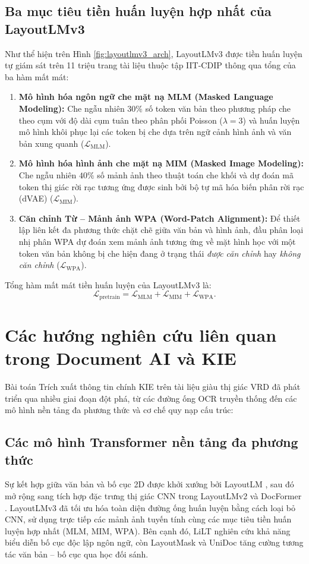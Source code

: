 \subsection{Ba mục tiêu tiền huấn luyện hợp nhất của LayoutLMv3}
Như thể hiện trên Hình \ref{fig:layoutlmv3_arch}, LayoutLMv3 được tiền huấn luyện tự giám sát trên 11 triệu trang tài liệu thuộc tập IIT-CDIP thông qua tổng của ba hàm mất mát:
\begin{enumerate}
    \item \textbf{Mô hình hóa ngôn ngữ che mặt nạ MLM (Masked Language Modeling):} Che ngẫu nhiên $30\%$ số token văn bản theo phương pháp che theo cụm với độ dài cụm tuân theo phân phối Poisson ($\lambda = 3$) và huấn luyện mô hình khôi phục lại các token bị che dựa trên ngữ cảnh hình ảnh và văn bản xung quanh ($\mathcal{L}_{\text{MLM}}$).
    \item \textbf{Mô hình hóa hình ảnh che mặt nạ MIM (Masked Image Modeling):} Che ngẫu nhiên $40\%$ số mảnh ảnh theo thuật toán che khối và dự đoán mã token thị giác rời rạc tương ứng được sinh bởi bộ tự mã hóa biến phân rời rạc (dVAE) ($\mathcal{L}_{\text{MIM}}$).
    \item \textbf{Căn chỉnh Từ -- Mảnh ảnh WPA (Word-Patch Alignment):} Để thiết lập liên kết đa phương thức chặt chẽ giữa văn bản và hình ảnh, đầu phân loại nhị phân WPA dự đoán xem mảnh ảnh tương ứng về mặt hình học với một token văn bản không bị che hiện đang ở trạng thái \textit{được căn chỉnh} hay \textit{không căn chỉnh} ($\mathcal{L}_{\text{WPA}}$).
\end{enumerate}

Tổng hàm mất mát tiền huấn luyện của LayoutLMv3 là:
\begin{equation}
    \mathcal{L}_{\text{pretrain}} = \mathcal{L}_{\text{MLM}} + \mathcal{L}_{\text{MIM}} + \mathcal{L}_{\text{WPA}}.
\end{equation}

\section{Các hướng nghiên cứu liên quan trong Document AI và KIE}
Bài toán Trích xuất thông tin chính KIE trên tài liệu giàu thị giác VRD đã phát triển qua nhiều giai đoạn đột phá, từ các đường ống OCR truyền thống đến các mô hình nền tảng đa phương thức và cơ chế quy nạp cấu trúc:

\subsection{Các mô hình Transformer nền tảng đa phương thức}
Sự kết hợp giữa văn bản và bố cục 2D được khởi xướng bởi LayoutLM \cite{xu2020layoutlm}, sau đó mở rộng sang tích hợp đặc trưng thị giác CNN trong LayoutLMv2 \cite{xu2021layoutlmv2} và DocFormer \cite{appalaraju2021docformer}. LayoutLMv3 \cite{huang2022layoutlmv3} đã tối ưu hóa toàn diện đường ống huấn luyện bằng cách loại bỏ CNN, sử dụng trực tiếp các mảnh ảnh tuyến tính \cite{kim2021vilt,li2022dit} cùng các mục tiêu tiền huấn luyện hợp nhất (MLM, MIM, WPA). Bên cạnh đó, LiLT \cite{wang2022lilt} nghiên cứu khả năng biểu diễn bố cục độc lập ngôn ngữ, còn LayoutMask \cite{tu2023layoutmask} và UniDoc \cite{gu2021unidoc} tăng cường tương tác văn bản -- bố cục qua học đối sánh.

